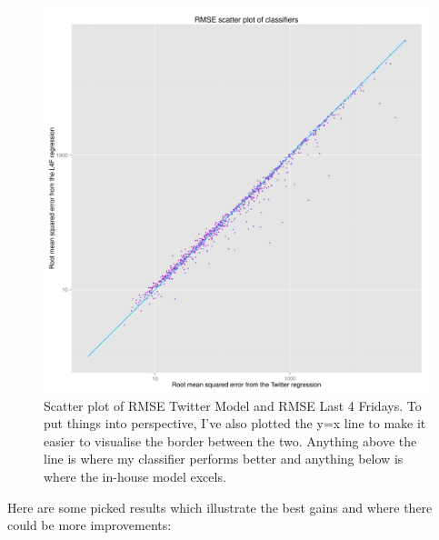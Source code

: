 \documentclass[minf,frontabs,twoside,singlespacing,parskip]{infthesis}
\begin{document}
\begin{figure}[h]
\begin{center}
\includegraphics[width=\textwidth]{RMSE}
\end{center}
\caption{Scatter plot of RMSE Twitter Model and RMSE Last 4 Fridays. To put things into perspective, I've also plotted the y=x line to make it easier to visualise the border between the two. Anything above the line is where my classifier performs better and anything below is where the in-house model excels.  }
\end{figure}


\newpage

Here are some picked results which illustrate the best gains and where there could be more improvements:
\end{document}

